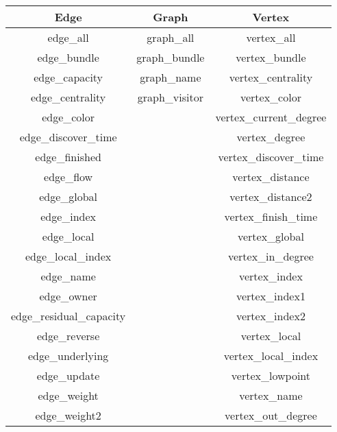 \begin{table}[h!]
  \centering
  \begin{tabular}{c c c} 
    \hline
    Edge                     & Graph          & Vertex                     \\
    \hline
    edge\_all                & graph\_all     & vertex\_all                \\
    edge\_bundle             & graph\_bundle  & vertex\_bundle             \\
    edge\_capacity           & graph\_name    & vertex\_centrality         \\
    edge\_centrality         & graph\_visitor & vertex\_color              \\
    edge\_color              &                & vertex\_current\_degree    \\
    edge\_discover\_time     &                & vertex\_degree             \\
    edge\_finished           &                & vertex\_discover\_time     \\
    edge\_flow               &                & vertex\_distance           \\
    edge\_global             &                & vertex\_distance2          \\
    edge\_index              &                & vertex\_finish\_time       \\
    edge\_local              &                & vertex\_global             \\
    edge\_local\_index       &                & vertex\_in\_degree         \\
    edge\_name               &                & vertex\_index              \\
    edge\_owner              &                & vertex\_index1             \\
    edge\_residual\_capacity &                & vertex\_index2             \\
    edge\_reverse            &                & vertex\_local              \\
    edge\_underlying         &                & vertex\_local\_index       \\
    edge\_update             &                & vertex\_lowpoint           \\
    edge\_weight             &                & vertex\_name               \\
    edge\_weight2            &                & vertex\_out\_degree        \\

\end{tabular}
\end{table}
